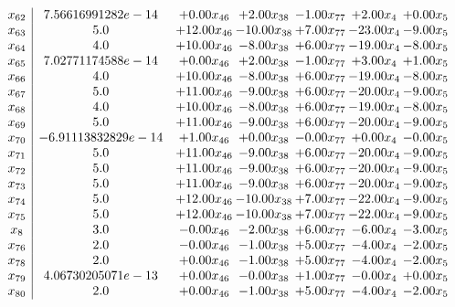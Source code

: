 \documentclass[8pt]{article}
\begin{document}
\[\begin{array}{c| c c@{\hskip 2pt} c@{\hskip 2pt} c@{\hskip 2pt} c@{\hskip 2pt} c@{\hskip 2pt} }
 x_{62}   &  7.56616991282e-14 & +  0.00 x_{46} & +  2.00 x_{38} & -1.00 x_{77} & +  2.00 x_{4} & +  0.00 x_{5}\\
 x_{63}   &  5.0 & + 12.00 x_{46} & -10.00 x_{38} & +  7.00 x_{77} & -23.00 x_{4} & -9.00 x_{5}\\
 x_{64}   &  4.0 & + 10.00 x_{46} & -8.00 x_{38} & +  6.00 x_{77} & -19.00 x_{4} & -8.00 x_{5}\\
 x_{65}   &  7.02771174588e-14 & +  0.00 x_{46} & +  2.00 x_{38} & -1.00 x_{77} & +  3.00 x_{4} & +  1.00 x_{5}\\
 x_{66}   &  4.0 & + 10.00 x_{46} & -8.00 x_{38} & +  6.00 x_{77} & -19.00 x_{4} & -8.00 x_{5}\\
 x_{67}   &  5.0 & + 11.00 x_{46} & -9.00 x_{38} & +  6.00 x_{77} & -20.00 x_{4} & -9.00 x_{5}\\
 x_{68}   &  4.0 & + 10.00 x_{46} & -8.00 x_{38} & +  6.00 x_{77} & -19.00 x_{4} & -8.00 x_{5}\\
 x_{69}   &  5.0 & + 11.00 x_{46} & -9.00 x_{38} & +  6.00 x_{77} & -20.00 x_{4} & -9.00 x_{5}\\
 x_{70}   &  -6.91113832829e-14 & +  1.00 x_{46} & +  0.00 x_{38} & -0.00 x_{77} & +  0.00 x_{4} & -0.00 x_{5}\\
 x_{71}   &  5.0 & + 11.00 x_{46} & -9.00 x_{38} & +  6.00 x_{77} & -20.00 x_{4} & -9.00 x_{5}\\
 x_{72}   &  5.0 & + 11.00 x_{46} & -9.00 x_{38} & +  6.00 x_{77} & -20.00 x_{4} & -9.00 x_{5}\\
 x_{73}   &  5.0 & + 11.00 x_{46} & -9.00 x_{38} & +  6.00 x_{77} & -20.00 x_{4} & -9.00 x_{5}\\
 x_{74}   &  5.0 & + 12.00 x_{46} & -10.00 x_{38} & +  7.00 x_{77} & -22.00 x_{4} & -9.00 x_{5}\\
 x_{75}   &  5.0 & + 12.00 x_{46} & -10.00 x_{38} & +  7.00 x_{77} & -22.00 x_{4} & -9.00 x_{5}\\
 x_{8}   &  3.0 & -0.00 x_{46} & -2.00 x_{38} & +  6.00 x_{77} & -6.00 x_{4} & -3.00 x_{5}\\
 x_{76}   &  2.0 & -0.00 x_{46} & -1.00 x_{38} & +  5.00 x_{77} & -4.00 x_{4} & -2.00 x_{5}\\
 x_{78}   &  2.0 & +  0.00 x_{46} & -1.00 x_{38} & +  5.00 x_{77} & -4.00 x_{4} & -2.00 x_{5}\\
 x_{79}   &  4.06730205071e-13 & +  0.00 x_{46} & -0.00 x_{38} & +  1.00 x_{77} & -0.00 x_{4} & +  0.00 x_{5}\\
 x_{80}   &  2.0 & +  0.00 x_{46} & -1.00 x_{38} & +  5.00 x_{77} & -4.00 x_{4} & -2.00 x_{5}\\

\end{array}\]
\end{document}
